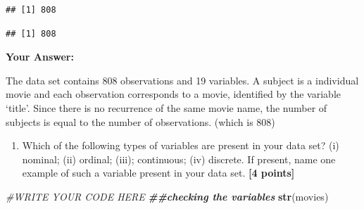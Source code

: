\documentclass[
]{article}
\newenvironment{Shaded}{\begin{snugshade}}{\end{snugshade}}
\newcommand{\CommentTok}[1]{\textcolor[rgb]{0.56,0.35,0.01}{\textit{#1}}}
\newcommand{\DocumentationTok}[1]{\textcolor[rgb]{0.56,0.35,0.01}{\textbf{\textit{#1}}}}
\newcommand{\FunctionTok}[1]{\textcolor[rgb]{0.13,0.29,0.53}{\textbf{#1}}}
\newcommand{\NormalTok}[1]{#1}
\newcommand{\SpecialCharTok}[1]{\textcolor[rgb]{0.81,0.36,0.00}{\textbf{#1}}}
\providecommand{\tightlist}{%
  \setlength{\itemsep}{0pt}\setlength{\parskip}{0pt}}
\begin{document}
\begin{verbatim}
## [1] 808
\end{verbatim}

\begin{Shaded}
\end{Shaded}

\begin{verbatim}
## [1] 808
\end{verbatim}

\textbf{Your Answer:}

The data set contains 808 observations and 19 variables. A subject is a
individual movie and each observation corresponds to a movie, identified
by the variable `title'. Since there is no recurrence of the same movie
name, the number of subjects is equal to the number of observations.
(which is 808)

\begin{enumerate}
\def\labelenumi{\arabic{enumi}.}
\setcounter{enumi}{1}
\tightlist
\item
  Which of the following types of variables are present in your data
  set? (i) nominal; (ii) ordinal; (iii); continuous; (iv) discrete. If
  present, name one example of such a variable present in your data set.
  \textbf{[4 points]}
\end{enumerate}

\begin{Shaded}
\begin{Highlighting}[]
\CommentTok{\#WRITE YOUR CODE HERE}
\DocumentationTok{\#\#checking the variables}
\FunctionTok{str}\NormalTok{(movies)}
\end{Highlighting}
\end{Shaded}
\end{document}
